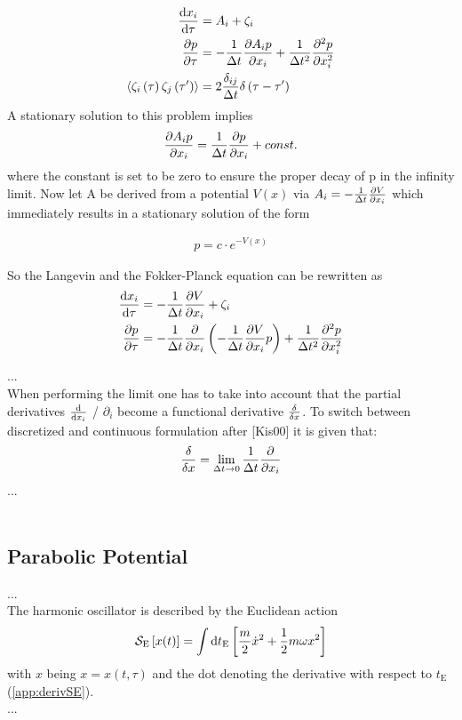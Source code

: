 \begin{align}
    \dv{x_i}{\tau} &= A_i + \zeta_i\\
    \pdv{p}{\tau} &= - \frac{1}{\Delta t} \pdv{A_i p}{x_i} + \frac{1}{\Delta t^2} \pdv[2]{p}{x_i}\\
    \langle \zeta_i \left(\tau \right) \zeta_j \left( \tau' \right) \rangle &= 2 \frac{\delta_{ij}}{\Delta t} \delta\left( \tau - \tau' \right)
\end{align}
\noindent A stationary solution to this problem implies
\begin{align}
    \pdv{A_i p}{x_i} = \frac{1}{\Delta t} \pdv{p}{x_i} + const.
\end{align}
where the constant is set to be zero to ensure the proper decay of p in the infinity  limit. Now let A be derived from a potential $V(x)$ via $A_i = - \frac{1}{\Delta t} \pdv{V}{x_i}$ which immediately results in a stationary solution of the form

\begin{align}
    p = c \cdot e^{-V(x)}
\end{align}{}

\noindent So the Langevin and the Fokker-Planck equation can be rewritten as
\begin{align}
    \dv{x_i}{\tau} &= - \frac{1}{\Delta t} \pdv{V}{x_i} + \zeta_i\\
    \pdv{p}{\tau} &= - \frac{1}{\Delta t} \pdv{x_i} \left( - \frac{1}{\Delta t} \pdv{V}{x_i} p \right) + \frac{1}{\Delta t^2} \pdv[2]{p}{x_i}
\end{align}{}

...\\
When performing the limit one has to take into account that the partial derivatives $\dv{x_i}$ / $\partial_i$  become a functional derivative $\fdv{x}$. To switch between discretized and continuous formulation after [Kis00] it is given that:
\begin{equation}
    \fdv{x} = \lim\limits_{\Delta t \to 0} \OverDeltaT{1} \pdv{x_i}
\end{equation}
...\\
\\
\subsection{Parabolic Potential}

...\\
The harmonic oscillator is described by the Euclidean action
\begin{align}
    \mathcal{S}_\mathrm{E}\left[x(t)\right] = \int\dd{t_\mathrm{E}}\left[\frac{m}{2}\dot{x}^2 + \frac{1}{2} m \omega x^2\right]
\end{align}
with $x$ being $x = x(t, \tau )$ and the dot denoting the derivative with respect to $t_\mathrm{E}$ (\ref{app:derivSE}).\\
...

